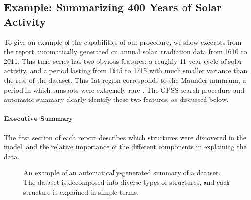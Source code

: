 \documentclass[twoside]{article}
\begin{document}
\subsection{Example: Summarizing 400 Years of Solar Activity}
\label{sec:example}

To give an example of the capabilities of our procedure, we show excerpts from the report automatically generated on annual solar irradiation data from 1610 to 2011.  This time series has two obvious features: a roughly 11-year cycle of solar activity, and a period lasting from 1645 to 1715 with much smaller variance than the rest of the dataset.  This flat region corresponds to the Maunder minimum, a period in which sunspots were extremely rare \citep{lean1995reconstruction}.
%
The GPSS search procedure and automatic summary clearly identify these two features, as discussed below.

\paragraph{Executive Summary}

The first section of each report describes which structures were discovered in the model, and the relative importance of the different components in explaining the data.

\begin{figure}[h]
\centering
{}
\caption{
An example of an automatically-generated summary of a dataset.  The dataset is decomposed into diverse types of structures, and each structure is explained in simple terms.}
\label{fig:exec}
\end{figure}
\end{document}
